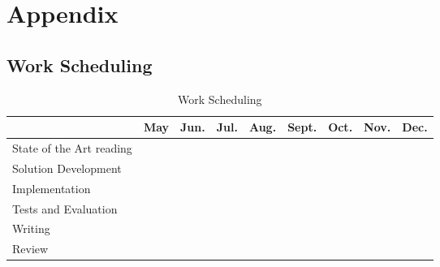 
\section{Appendix} 
\label{sec:attachments}

\subsection{Work Scheduling} %
\label{sub:work_scheduling}

\begin{table}[H]
  \label{tab:worktable}
  \begin{center}
    \begin{tabular}{|l||c|c|c|c|c|c|c|c|}
    \hline & \textbf{May} & \textbf{Jun.} & \textbf{Jul.} & \textbf{Aug.} & \textbf{Sept.} & \textbf{Oct.} & \textbf{Nov.} & \textbf{Dec.}\\
    \hline
    \hline
      State of the Art reading & \cellcolor{black!50} & \cellcolor{black!50} &   &   &  & &  &  \\
    \hline
      Solution Development & \cellcolor{black!50} & \cellcolor{black!50} &   &   &   & &  &  \\
    \hline
      Implementation &  & \cellcolor{black!50} & \cellcolor{black!50} & \cellcolor{black!50} & \cellcolor{black!50} &  &   &  \\
    \hline
      Tests and Evaluation &  &  &   &  & \cellcolor{black!50} & \cellcolor{black!50} &  &  \\
    \hline
      Writing &  & \cellcolor{black!50} & \cellcolor{black!50} & \cellcolor{black!50}  & \cellcolor{black!50} & \cellcolor{black!50} & \cellcolor{black!50} & \cellcolor{black!50} \\
    \hline
      Review &  &  &  &  &  & & \cellcolor{black!50} & \cellcolor{black!50} \\
    \hline
    \end{tabular}
    \caption{Work Scheduling}
  \end{center}
\end{table}